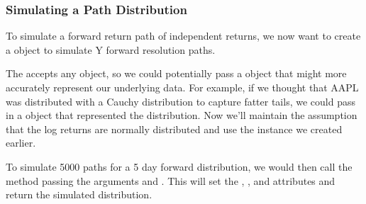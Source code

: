 \documentclass[letterpaper,10pt,english]{sphinxmanual}
\begin{document}
\subsubsection{Simulating a Path Distribution}
\label{\detokenize{gettingstarted:simulating-a-path-distribution}}
To simulate a forward return path of independent returns, we now want to
create a  object to simulate Y forward
resolution paths.

%
\begin{sphinxVerbatim}[commandchars=\\\{\}]
  
\end{sphinxVerbatim}

The  accepts any  object, so we could
potentially pass a  object that might more accurately
represent our underlying data. For example, if we thought that AAPL was
distributed with a Cauchy distribution to capture fatter tails, we could
pass in a  object that represented the distribution. Now
we’ll maintain the assumption that the log returns are normally
distributed and use the  instance we created earlier.

To simulate 5000 paths for a 5 day forward distribution, we would then
call the  method passing the arguments 
and . This will set the
, , and 
attributes and return the simulated distribution.

%
\begin{sphinxVerbatim}[commandchars=\\\{\}]
   
\end{sphinxVerbatim}
\end{document}
